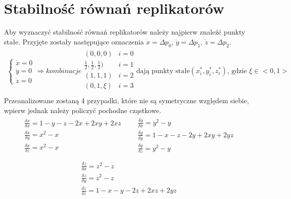 \section{Stabilność równań replikatorów}
\label{sec:stab_repl}
Aby wyznaczyć stabilność równań replikatorów należy najpierw znaleźć punkty stałe.  Przyjęte zostały następujące oznaczenia $\dot{x} = \Delta p_0$, $\dot{y} = \Delta p_1$, $\dot{z} = \Delta p_2$.
\begin{align*}
\left\{
\begin{array}{l}
\dot{x} = 0 \\
\dot{y} = 0 \\
\dot{z} = 0 
\end{array}
\right.
\Rightarrow kombinacje
\begin{array}{ll}
(0,0,0)  & i=0 \\
\frac{1}{2},\frac{1}{2},\frac{1}{2}) & i=1 \\
(1,1,1) & i=2 \\
(0,1,\xi) & i=3 \\ 
\end{array}
\text{dają punkty stałe} (x^*_i, y^*_i, z^*_i)\text{, gdzie }\xi \in <0,1>
\end{align*}
Przeanalizowane zostaną 4 przypadki, które nie są symetryczne względem siebie, wpierw  jednak należy policzyć pochodne cząstkowe.
\begin{align*}
\begin{array}{l}
\frac{\delta \dot{x}}{\delta x} = 1-y-z-2x+2xy+2xz\\
\frac{\delta \dot{x}}{\delta y} = x^2 - x\\
\frac{\delta \dot{x}}{\delta z} = x^2 - x\\
\end{array}
&&
\begin{array}{l}
\frac{\delta \dot{y}}{\delta x} = y^2 - y\\
\frac{\delta \dot{y}}{\delta y} = 1-x-z-2y+2xy+2yz\\
\frac{\delta \dot{y}}{\delta z} = y^2 - y\\
\end{array}
\end{align*}
\begin{align*}
\begin{array}{l}
\frac{\delta \dot{z}}{\delta x} = z^2 - z\\
\frac{\delta \dot{z}}{\delta y} = z^2 - z\\
\frac{\delta \dot{z}}{\delta z} = 1-x-y-2z+2xz+2yz\\
\end{array}
\end{align*}
